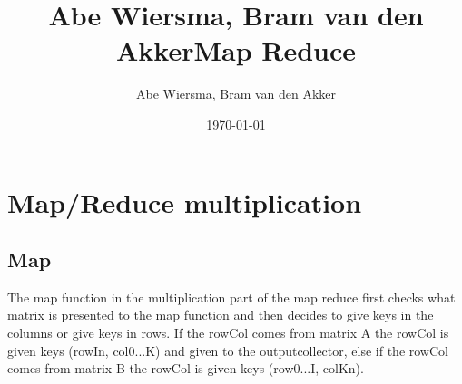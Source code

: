 \documentclass[10pt]{article}
\title{\bfseries\Huge Abe Wiersma, Bram van den Akker}
\date{}
\begin{document}
\title{Map Reduce}
\author{Abe Wiersma, Bram van den Akker}
\date{\today}
\maketitle
\newpage

\section{Map/Reduce multiplication}
\subsection{Map}
The map function in the multiplication part of the map reduce first checks what matrix is presented to the map function and then decides to give keys in the columns or give keys in rows. If the rowCol comes from matrix A the rowCol is given keys (rowIn, col0...K) and given to the outputcollector, else if the rowCol comes from matrix B the rowCol is given keys (row0...I, colKn).
\end{document}
